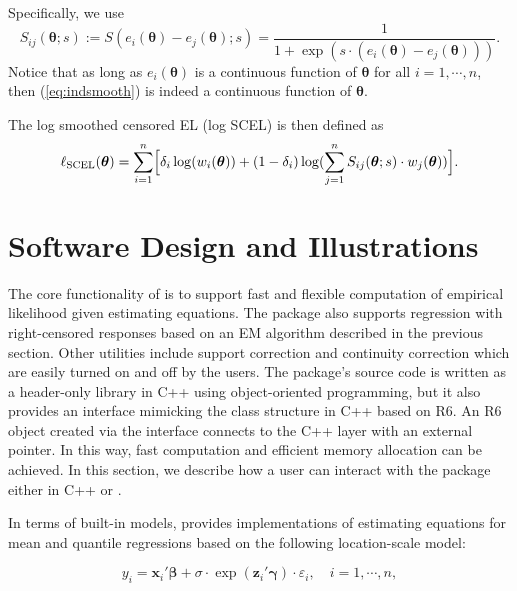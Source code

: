 \documentclass[article]{jss}
\renewcommand{\|}{\,|\,}
\begin{document}
Specifically, we use
\begin{equation}\label{eq:indsmooth}
  S_{ij}(\bm \theta;s) := S(e_i(\bm \theta)-e_j(\bm \theta);s)
  = \frac{1}{1+\exp(s\cdot(e_i(\bm \theta)-e_j(\bm \theta)))}.
\end{equation}
Notice that as long as \(e_i(\bm \theta)\) is a continuous function of \(\bm \theta\) for all \(i=1,\cdots,n\), then (\ref{eq:indsmooth}) is indeed a continuous function of \(\bm \theta\).

The log smoothed censored EL (log SCEL) is then defined as
\begin{equation}\label{eq:logel_smoo}
  \ell_{\textrm{SCEL}}(\bm \theta) = \sum_{i=1}^n \Bigl[\delta_i\log(w_i(\bm \theta)) +
    (1-\delta_i)\log(\sum_{j=1}^n S_{ij}(\bm \theta;s)\cdot w_j(\bm \theta))\Bigr].
\end{equation}

\hypertarget{software-design-and-illustrations}{%
\section{Software Design and Illustrations}\label{software-design-and-illustrations}}

The core functionality of  is to support fast and flexible computation of empirical likelihood given estimating equations. The package also supports regression with right-censored responses based on an EM algorithm described in the previous section. Other utilities include support correction and continuity correction which are easily turned on and off by the users. The package's source code is written as a header-only library in C++ using object-oriented programming, but it also provides an  interface mimicking the class structure in C++ based on R6. An R6 object created via the  interface connects to the C++ layer with an external pointer. In this way, fast computation and efficient memory allocation can be achieved. In this section, we describe how a user can interact with the package either in C++ or .

In terms of built-in models,  provides implementations of estimating equations for mean and quantile regressions based on the following location-scale model:

\begin{equation} \label{md:lsmod}
  y_i = \bm x_i'\bm \beta+ \sigma\cdot\exp(\bm z_i'\bm \gamma)\cdot\varepsilon_i, \quad i=1,\cdots,n,
\end{equation}
\end{document}
